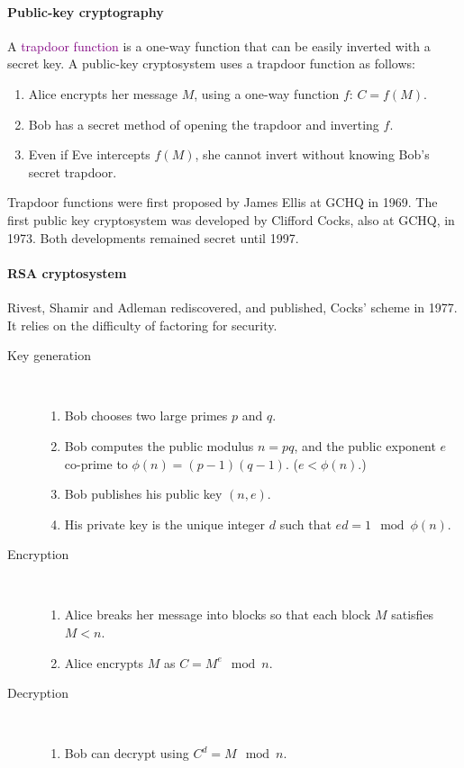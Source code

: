 \documentclass[a4paper, 11pt, openany]{book}
\numberwithin{equation}{section}
\theoremstyle{plain}
\theoremstyle{definition}
\newcommand{\Define}[1]{\textcolor{purple}{#1}}
\begin{document}
\paragraph{Public-key cryptography}
A \Define{trapdoor function} is a one-way function that can be easily inverted with a secret key. A public-key cryptosystem uses a trapdoor function as follows:
\begin{enumerate}
    \item Alice encrypts her message $M$, using a one-way function $f$: $C = f(M)$.

    \item Bob has a secret method of opening the trapdoor and inverting $f$.

    \item Even if Eve intercepts $f(M)$, she cannot invert without knowing Bob’s secret trapdoor.
\end{enumerate}
Trapdoor functions were first proposed by James Ellis at GCHQ in 1969. The first public key cryptosystem was developed by Clifford Cocks, also at GCHQ, in 1973. Both developments remained secret until 1997.



\paragraph{RSA cryptosystem}
Rivest, Shamir and Adleman rediscovered, and published, Cocks’ scheme in 1977. 
It relies on the difficulty of factoring for security.

\begin{description}
\item[Key generation]~
\begin{enumerate}
    \item Bob chooses two large primes $p$ and $q$.

    \item Bob computes the public modulus $n = pq$, and the public exponent $e$ co-prime to $\phi(n) = (p-1)(q-1)$. ($e< \phi(n)$.)

    \item Bob publishes his public key $(n,e)$.
    
    \item His private key is the unique integer $d$ such that $ed = 1 \mod \phi(n)$.
\end{enumerate}

\item [Encryption]~
\begin{enumerate}
    \item Alice breaks her message into blocks so that each block $M$ satisfies $M<n$.

    \item Alice encrypts $M$ as $C = M^e \mod n$.
\end{enumerate}

\item[Decryption]~
\begin{enumerate}
    \item Bob can decrypt using $C^d = M \mod n$.
\end{enumerate}
\end{description}
\end{document}
